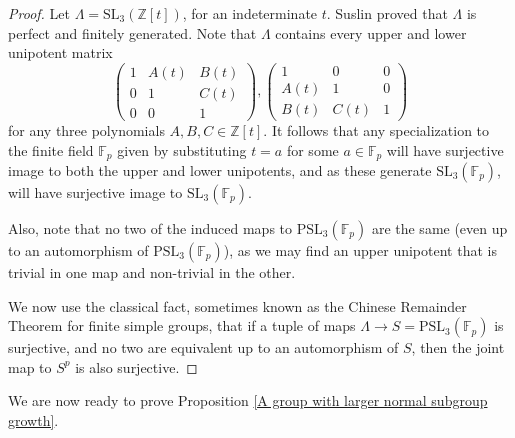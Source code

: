 \documentclass[letterpaper]{amsart}
\begin{document}
\begin{proof}
    Let $\Lambda = \mathrm{SL}_3(\mathbb{Z}[t])$, for an indeterminate $t$. Suslin proved \cite{suslin1977structure} that $\Lambda$ is perfect and finitely generated. Note that $\Lambda$ contains every upper and lower unipotent matrix $$\begin{pmatrix}1 & A(t) & B(t)\\ 0 & 1 & C(t) \\ 0 & 0 & 1\end{pmatrix}, \begin{pmatrix} 1 & 0 & 0\\ A(t) & 1 & 0 \\ B(t) & C(t) & 1\end{pmatrix}$$
    for any three polynomials $A, B, C \in \mathbb{Z}[t]$. It follows that any specialization to the finite field $\mathbb{F}_p$ given by substituting $t = a$ for some $a \in \mathbb{F}_p$ will have surjective image to both the upper and lower unipotents, and as these generate $\mathrm{SL}_3(\mathbb{F}_p)$, will have surjective image to $\mathrm{SL}_3(\mathbb{F}_p)$.

    Also, note that no two of the induced maps to $\mathrm{PSL}_3(\mathbb{F}_p)$ are the same (even up to an automorphism of $\mathrm{PSL}_3(\mathbb{F}_p)$), as we may find an upper unipotent that is trivial in one map and non-trivial in the other.

    We now use the classical fact, sometimes known as the Chinese Remainder Theorem for finite simple groups, that if a tuple of maps $\Lambda \to S = \mathrm{PSL}_3(\mathbb{F}_p)$ is surjective, and no two are equivalent up to an automorphism of $S$, then the joint map to $S^p$ is also surjective.
\end{proof}
We are now ready to prove Proposition \ref{A group with larger normal subgroup growth}.
\end{document}

